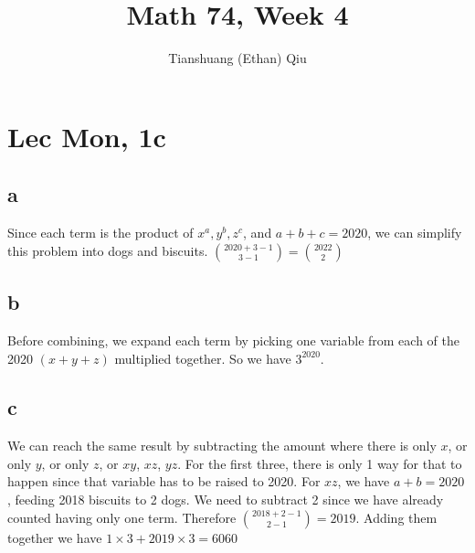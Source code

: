 \documentclass[12pt]{article}
\author{Tianshuang (Ethan) Qiu}
\begin{document}
\title{Math 74, Week 4}
\maketitle

\section{Lec Mon, 1c}
\subsection{a}
Since each term is the product of $x^a, y^b, z^c$, and $a+b+c = 2020$, we can simplify this problem into dogs and biscuits. $\binom{2020+3-1}{3-1} = \binom{2022}{2}$

\subsection{b}
Before combining, we expand each term by picking one variable from each of the 2020 $(x+y+z)$ multiplied together. So we have $3^2020$.

\subsection{c}
We can reach the same result by subtracting the amount where there is only $x$, or only $y$, or only $z$, or $xy$, $xz$, $yz$.
\newline
For the first three, there is only 1 way for that to happen since that variable has to be raised to 2020. For $xz$, we have $a+b = 2020$, feeding 2018 biscuits to 2 dogs. We need to subtract 2 since we have already counted having only one term. Therefore $\binom{2018+2-1}{2-1} = 2019$.
\newline
Adding them together we have $1 \times 3 + 2019 \times 3 = 6060$ 
\end{document}
